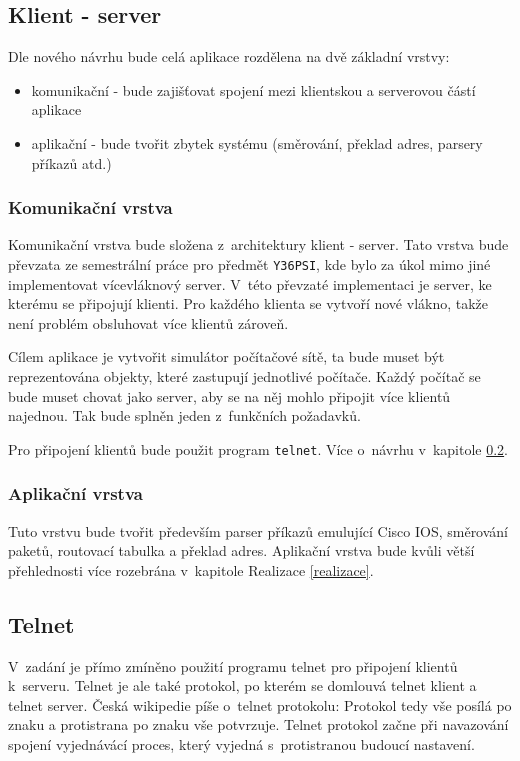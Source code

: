 
\subsection{Klient - server}\label{klient_server}
Dle nového návrhu bude celá aplikace rozdělena na dvě základní vrstvy:
\begin{itemize}
 \item komunikační - bude zajišťovat spojení mezi klientskou a serverovou částí aplikace
 \item aplikační - bude tvořit zbytek systému (směrování, překlad adres, parsery příkazů atd.)
\end{itemize}

\subsubsection{Komunikační vrstva}
Komunikační vrstva bude složena z~architektury klient - server. Tato vrstva bude převzata ze semestrální práce pro předmět \verb|Y36PSI|, kde bylo za úkol mimo jiné implementovat vícevláknový server. V~této převzaté implementaci je server, ke kterému se připojují klienti. Pro každého klienta se vytvoří nové vlákno, takže není problém obsluhovat více klientů zároveň. 

Cílem aplikace je vytvořit simulátor počítačové sítě, ta bude muset být reprezentována objekty, které zastupují jednotlivé počítače. Každý počítač se bude muset chovat jako server, aby se na něj mohlo připojit více klientů najednou. Tak bude splněn jeden z~funkčních požadavků.

Pro připojení klientů bude použit program \verb|telnet|. Více o~návrhu v~kapitole \ref{telnet}. 


\subsubsection{Aplikační vrstva}
Tuto vrstvu bude tvořit především parser příkazů emulující Cisco IOS, směrování paketů, routovací tabulka a překlad adres. Aplikační vrstva bude kvůli větší přehlednosti více rozebrána v~kapitole Realizace \ref{realizace}.


\subsection{Telnet} \label{telnet}
V~zadání je přímo zmíněno použití programu telnet pro připojení klientů k~serveru. Telnet je ale také protokol, po kterém se domlouvá telnet klient a telnet server. Česká wikipedie píše o~telnet protokolu: \cite{wiki:telnet} Protokol tedy vše posílá po znaku a protistrana po znaku vše potvrzuje. Telnet protokol začne při navazování spojení vyjednávácí proces, který vyjedná s~protistranou budoucí nastavení.

